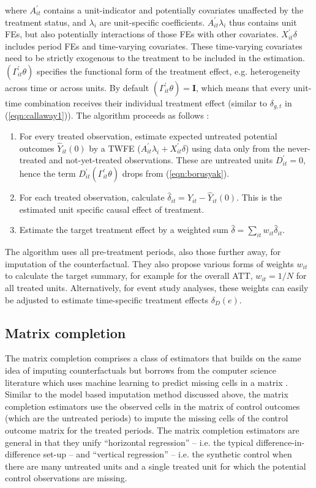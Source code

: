 \noindent where $A_{it}^{'}$ contains a unit-indicator and potentially covariates unaffected by the treatment status, and $\lambda_i$ are unit-specific coefficients. $A_{it}^{'}\lambda_i$ thus contains unit FEs, but also potentially interactions of those FEs with other covariates. $X_{it}^{'}\delta$ includes period FEs and time-varying covariates. These time-varying covariates need to be strictly exogenous to the treatment to be included in the estimation. $(\Gamma_{it}^{'}\theta)$ specifies the functional form of the treatment effect, e.g. heterogeneity across time or across units. By default $(\Gamma_{it}^{'}\theta) = \textbf{I}$, which means that every unit-time combination receives their individual treatment effect (similar to $\delta_{g,t}$ in (\ref{eqn:callaway1})). The algorithm proceeds as follows \cite{Borusyak.2023}:

\begin{enumerate}
\item For every treated observation, estimate expected untreated potential outcomes $\hat Y_{it}(0)$ by a TWFE ($A_{it}^{'}\lambda_i + X_{it}^{'}\delta$) using data only from the never-treated and not-yet-treated observations. These are untreated units $D_{it}^{'}=0$, hence the term $D_{it}^{'}(\Gamma_{it}^{'}\theta)$ drops from (\ref{eqn:borusyak}). 
\item For each treated observation, calculate $\hat\delta_{it} = Y_{it} - \hat{Y}_{it}(0)$. This is the estimated unit specific causal effect of treatment. 
\item Estimate the target treatment effect by a weighted sum $\hat\delta = \sum_{it}w_{it}\hat\delta_{it}$.
\end{enumerate}


The \textcite{Borusyak.2023} algorithm uses all pre-treatment periods, also those further away, for imputation of the counterfactual. They also propose various forms of weights $w_{it}$ to calculate the target summary, for example for the overall ATT, $w_{it} = 1/N$ for all treated units. Alternatively, for event study analyses, these weights can easily be adjusted to estimate time-specific treatment effects $\delta_D(e)$.

\subsection{Matrix completion}

The matrix completion \cite{Athey.2021} comprises a class of estimators that builds on the same idea of imputing counterfactuals but borrows from the computer science literature which uses machine learning to predict missing cells in a matrix \cite[for a similar approach see][]{Xu.2017}. Similar to the model based imputation method discussed above, the matrix completion estimators use the observed cells in the matrix of control outcomes (which are the untreated periods) to impute the missing cells of the control outcome matrix for the treated periods. The matrix completion estimators are general in that they unify ``horizontal regression'' -- i.e. the typical difference-in-difference set-up -- and ``vertical regression'' -- i.e. the synthetic control when there are many untreated units and a single treated unit for which the potential control observations are missing.

